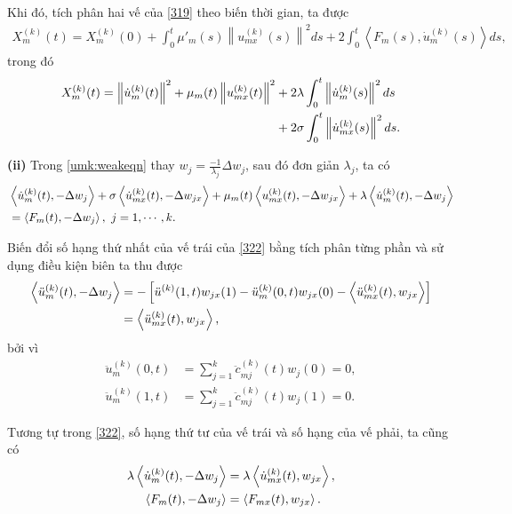 \documentclass[12pt,a4paper]{article}
\theoremstyle{definition}
\theoremstyle{definition}
\begin{document}
Khi đó, tích phân hai vế của \eqref{319} theo biến thời gian, ta được
\begin{align}
    X_m^{(k)}(t) = X_m^{(k)}(0) + \int_0^t \mu'_m(s) \left\|u_{mx}^{(k)}(s)\right\|^2  ds + 2 \int_0^t \left<F_m(s), \dot{u}_m^{(k)}(s)\right>  ds,
\end{align}
trong đó
\begin{align}
    X_m^{(k)}(t) = \left\|\dot{u}_m^{(k)}(t)\right\|^2 + \mu_m(t) \left\|u_{mx}^{(k)}(t)\right\|^2 &+ 2 \lambda \int_0^t \left\|\dot{u}_m^{(k)}(s)\right\|^2  ds \\
    &+ 2 \sigma \int_0^t \left\|\dot{u}_{mx}^{(k)}(s)\right\|^2 ds. \notag
\end{align}

\textbf{(ii)} Trong \eqref{umk:weakeqn} thay $w_j  = \frac{-1}{\lambda_j}\Delta w_j$, sau đó đơn giản $\lambda_j$, ta có
\begin{align} \label{322}
    &\left<\dot{u}_m^{(k)}(t), -\Delta w_j\right>
    + \sigma \left< \dot{u}_{mx}^{(k)}(t), -\Delta w_{jx}\right>
    + \mu_m(t) \left<u_{mx}^{(k)}(t), -\Delta w_{jx}\right>
    + \lambda \left< \dot{u}_m^{(k)}(t), -\Delta w_j\right> \notag \\
    &=\left<F_m(t), -\Delta w_j\right>, \ j = 1,\cdots,k.
\end{align}

Biến đổi số hạng thứ nhất của vế trái của \eqref{322} bằng tích phân từng phần và sử dụng điều kiện biên ta thu được
\begin{align}
    \left<\ddot{u}_m^{(k)}(t), -\Delta w_j\right>
    &= - \left[\ddot{u}^{(k)}(1,t) w_{jx}(1) - \ddot{u}_m^{(k)}(0,t) w_{jx}(0) - \left<\ddot{u}_{mx}^{(k)}(t), w_{jx}\right>\right] \\
    &= \left<\ddot{u}_{mx}^{(k)}(t), w_{jx}\right>, \notag
\end{align}
bởi vì
\begin{align*}
    \ddot{u}_m^{(k)}(0,t) &= \sum_{j=1}^k \ddot{c}_{mj}^{(k)}(t) w_j(0) = 0, \\
    \ddot{u}_m^{(k)}(1,t) &= \sum_{j=1}^k \ddot{c}_{mj}^{(k)}(t) w_j(1) = 0.
\end{align*}

Tương tự trong \eqref{322}, số hạng thứ tư của vế trái và số hạng của vế phải, ta cũng có
\begin{align}
    \lambda \left< \dot{u}_m^{(k)}(t), -\Delta w_j\right> &= \lambda \left<\dot{u}_{mx}^{(k)}(t), w_{jx}\right>, \\
    \left< F_m(t), -\Delta w_j\right> &= \left<F_{mx}(t), w_{jx}\right>. \notag
\end{align}
\end{document}
